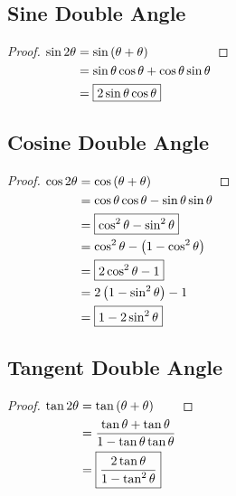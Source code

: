 \documentclass{article}
\begin{document}
\subsection{Sine Double Angle}
\label{proof:sindouble}
\begin{proof}
	$\begin{aligned}[t]
		\sin2\theta&=\sin\left(\theta+\theta\right) \\
		&=\sin\theta\cos\theta+\cos\theta\sin\theta \\
		&=\boxed{2\sin\theta\cos\theta} \\
	\end{aligned} \\$
\end{proof}

\subsection{Cosine Double Angle}
\label{proof:cosdouble}
\begin{proof}
	$\begin{aligned}[t]
		\cos2\theta&=\cos\left(\theta+\theta\right) \\
		&=\cos\theta\cos\theta-\sin\theta\sin\theta \\
		&=\boxed{\cos^2\theta-\sin^2\theta} \\
		&=\cos^2\theta-\left(1-\cos^2\theta\right) \\
		&=\boxed{2\cos^2\theta-1} \\
		&=2\left(1-\sin^2\theta\right)-1 \\
		&=\boxed{1-2\sin^2\theta} \\
	\end{aligned} \\$
\end{proof}

\subsection{Tangent Double Angle}
\label{proof:tandouble}
\begin{proof}
	$\begin{aligned}[t]
		\tan2\theta&=\tan\left(\theta+\theta\right) \\
		&=\frac{\tan\theta+\tan\theta}{1-\tan\theta\tan\theta} \\
		&=\boxed{\frac{2\tan\theta}{1-\tan^2\theta}} \\
	\end{aligned} \\$
\end{proof}
\end{document}
